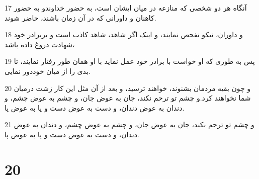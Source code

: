 \par 17 آنگاه هر دو شخصی که منازعه در میان ایشان است، به حضور خداوندو به حضور کاهنان و داورانی که در آن زمان باشند، حاضر شوند.
\par 18 و داوران، نیکو تفحص نمایند، و اینک اگر شاهد، شاهد کاذب است و بربرادر خود شهادت دروغ داده باشد،
\par 19 پس به طوری که او خواست با برادر خود عمل نماید با او همان طور رفتار نمایند، تا بدی را از میان خوددور نمایی.
\par 20 و چون بقیه مردمان بشنوند، خواهند ترسید، و بعد از آن مثل این کار زشت درمیان شما نخواهند کرد.و چشم تو ترحم نکند، جان به عوض جان، و چشم به عوض چشم، و دندان به عوض دندان، و دست به عوض دست و پا به عوض پا.
\par 21 و چشم تو ترحم نکند، جان به عوض جان، و چشم به عوض چشم، و دندان به عوض دندان، و دست به عوض دست و پا به عوض پا.
 
\chapter{20}

